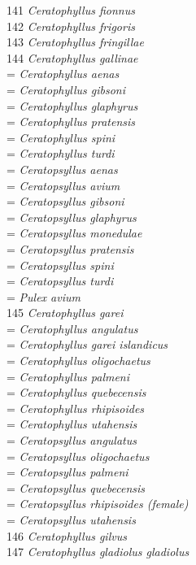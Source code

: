 \documentclass[
]{article}
\begin{document}
141 \emph{Ceratophyllus fionnus}\\
142 \emph{Ceratophyllus frigoris}\\
143 \emph{Ceratophyllus fringillae}\\
144 \emph{Ceratophyllus gallinae}\\
= \emph{Ceratophyllus aenas}\\
= \emph{Ceratophyllus gibsoni}\\
= \emph{Ceratophyllus glaphyrus}\\
= \emph{Ceratophyllus pratensis}\\
= \emph{Ceratophyllus spini}\\
= \emph{Ceratophyllus turdi}\\
= \emph{Ceratopsyllus aenas}\\
= \emph{Ceratopsyllus avium}\\
= \emph{Ceratopsyllus gibsoni}\\
= \emph{Ceratopsyllus glaphyrus}\\
= \emph{Ceratopsyllus monedulae}\\
= \emph{Ceratopsyllus pratensis}\\
= \emph{Ceratopsyllus spini}\\
= \emph{Ceratopsyllus turdi}\\
= \emph{Pulex avium}\\
145 \emph{Ceratophyllus garei}\\
= \emph{Ceratophyllus angulatus}\\
= \emph{Ceratophyllus garei islandicus}\\
= \emph{Ceratophyllus oligochaetus}\\
= \emph{Ceratophyllus palmeni}\\
= \emph{Ceratophyllus quebecensis}\\
= \emph{Ceratophyllus rhipisoides}\\
= \emph{Ceratophyllus utahensis}\\
= \emph{Ceratopsyllus angulatus}\\
= \emph{Ceratopsyllus oligochaetus}\\
= \emph{Ceratopsyllus palmeni}\\
= \emph{Ceratopsyllus quebecensis}\\
= \emph{Ceratopsyllus rhipisoides (female)}\\
= \emph{Ceratopsyllus utahensis}\\
146 \emph{Ceratophyllus gilvus}\\
147 \emph{Ceratophyllus gladiolus gladiolus}\\
\end{document}
